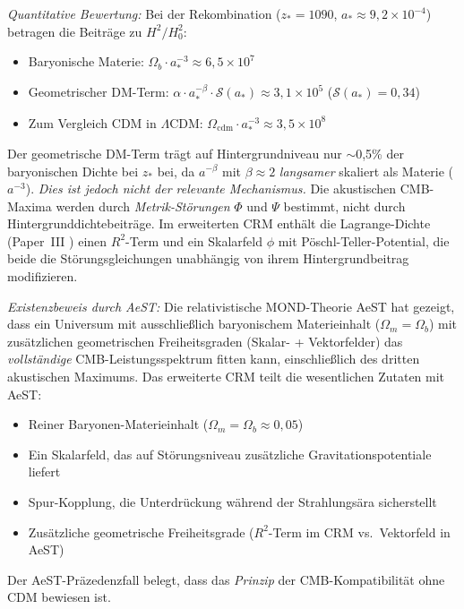 \documentclass[aps,prd,twocolumn,superscriptaddress,nofootinbib]{revtex4-2}
\begin{document}
\textit{Quantitative Bewertung:} Bei der Rekombination ($z_* = 1090$, $a_* \approx 9{,}2 \times 10^{-4}$) betragen die Beitr\"age zu $H^2/H_0^2$:
\begin{itemize}
\item Baryonische Materie: $\Omega_b \cdot a_*^{-3} \approx 6{,}5 \times 10^7$
\item Geometrischer DM-Term: $\alpha \cdot a_*^{-\beta} \cdot \mathcal{S}(a_*) \approx 3{,}1 \times 10^5$ \quad ($\mathcal{S}(a_*) = 0{,}34$)
\item Zum Vergleich CDM in $\Lambda$CDM: $\Omega_{\mathrm{cdm}} \cdot a_*^{-3} \approx 3{,}5 \times 10^8$
\end{itemize}

Der geometrische DM-Term tr\"agt auf Hintergrundniveau nur $\sim$0{,}5\% der baryonischen Dichte bei $z_*$ bei, da $a^{-\beta}$ mit $\beta \approx 2$ \textit{langsamer} skaliert als Materie ($a^{-3}$). \textit{Dies ist jedoch nicht der relevante Mechanismus.} Die akustischen CMB-Maxima werden durch \textit{Metrik-St\"orungen} $\Phi$ und $\Psi$ bestimmt, nicht durch Hintergrunddichtebeitr\"age. Im erweiterten CRM enth\"alt die Lagrange-Dichte (Paper~III \cite{Geiger2026c}) einen $R^2$-Term und ein Skalarfeld $\phi$ mit P\"oschl-Teller-Potential, die beide die St\"orungsgleichungen unabh\"angig von ihrem Hintergrundbeitrag modifizieren.

\textit{Existenzbeweis durch AeST:} Die relativistische MOND-Theorie AeST \cite{Skordis2021} hat gezeigt, dass ein Universum mit ausschlie\ss{}lich baryonischem Materieinhalt ($\Omega_m = \Omega_b$) mit zus\"atzlichen geometrischen Freiheitsgraden (Skalar- + Vektorfelder) das \textit{vollst\"andige} CMB-Leistungsspektrum fitten kann, einschlie\ss{}lich des dritten akustischen Maximums. Das erweiterte CRM teilt die wesentlichen Zutaten mit AeST:
\begin{itemize}
\item Reiner Baryonen-Materieinhalt ($\Omega_m = \Omega_b \approx 0{,}05$)
\item Ein Skalarfeld, das auf St\"orungsniveau zus\"atzliche Gravitationspotentiale liefert
\item Spur-Kopplung, die Unterdr\"uckung w\"ahrend der Strahlungs\"ara sicherstellt
\item Zus\"atzliche geometrische Freiheitsgrade ($R^2$-Term im CRM vs.\ Vektorfeld in AeST)
\end{itemize}

Der AeST-Pr\"azedenzfall belegt, dass das \textit{Prinzip} der CMB-Kompatibilit\"at ohne CDM bewiesen ist.
\end{document}
